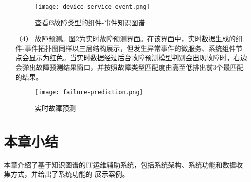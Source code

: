 \begin{itemize}
    \begin{figure}[htbp]
        \centering
        \texttt{[image: device-service-event.png]}
        \caption{查看f3故障类型的组件-事件知识图谱\label{device-service-event}}
    \end{figure}
    \item [（4）]故障预测。图\ref{failure-prediction}为实时故障预测界面。在该界面中，实时数据生成的组件-事件拓扑图同样以三层结构展示，但发生异常事件的微服务、系统组件节点会显示为红色。当实时数据经过后台故障预测模型判别会出现故障时，右边会弹出故障预测结果窗口，并按照故障类型匹配度由高至低排出前3个最匹配的结果。
    \begin{figure}[htbp]
        \centering
        \texttt{[image: failure-prediction.png]}
        \caption{实时故障预测\label{failure-prediction}}
    \end{figure}
\end{itemize}

\section{本章小结}
本章介绍了基于知识图谱的IT运维辅助系统，包括系统架构、系统功能和数据收集方式，并给出了系统功能的
展示案例。